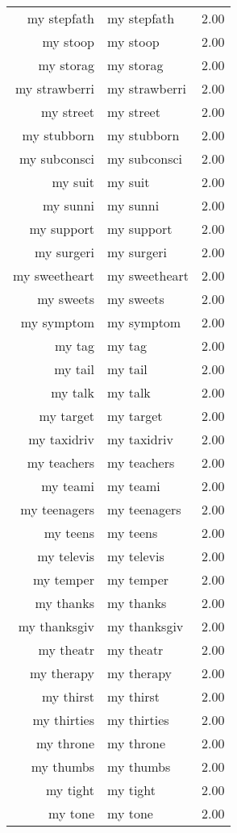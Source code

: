 \begin{table}[ht]
\begin{tabular}{rlr}
  my stepfath & my stepfath & 2.00 \\ 
  my stoop & my stoop & 2.00 \\ 
  my storag & my storag & 2.00 \\ 
  my strawberri & my strawberri & 2.00 \\ 
  my street & my street & 2.00 \\ 
  my stubborn & my stubborn & 2.00 \\ 
  my subconsci & my subconsci & 2.00 \\ 
  my suit & my suit & 2.00 \\ 
  my sunni & my sunni & 2.00 \\ 
  my support & my support & 2.00 \\ 
  my surgeri & my surgeri & 2.00 \\ 
  my sweetheart & my sweetheart & 2.00 \\ 
  my sweets & my sweets & 2.00 \\ 
  my symptom & my symptom & 2.00 \\ 
  my tag & my tag & 2.00 \\ 
  my tail & my tail & 2.00 \\ 
  my talk & my talk & 2.00 \\ 
  my target & my target & 2.00 \\ 
  my taxidriv & my taxidriv & 2.00 \\ 
  my teachers & my teachers & 2.00 \\ 
  my teami & my teami & 2.00 \\ 
  my teenagers & my teenagers & 2.00 \\ 
  my teens & my teens & 2.00 \\ 
  my televis & my televis & 2.00 \\ 
  my temper & my temper & 2.00 \\ 
  my thanks & my thanks & 2.00 \\ 
  my thanksgiv & my thanksgiv & 2.00 \\ 
  my theatr & my theatr & 2.00 \\ 
  my therapy & my therapy & 2.00 \\ 
  my thirst & my thirst & 2.00 \\ 
  my thirties & my thirties & 2.00 \\ 
  my throne & my throne & 2.00 \\ 
  my thumbs & my thumbs & 2.00 \\ 
  my tight & my tight & 2.00 \\ 
  my tone & my tone & 2.00 \\ 

\end{tabular}
\end{table}
